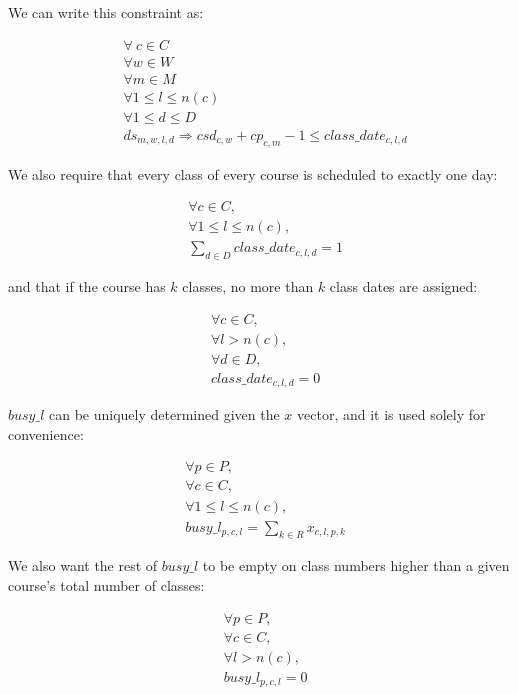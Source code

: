 We can write this constraint as:

\begin{align}
  &\forall\ c \in C\\
  &\forall w \in W\\
  &\forall m \in M\\
  &\forall 1 \le l \le n(c)\\
  &\forall 1 \le d \le D\\
  &ds_{m, w, l, d} \Rightarrow csd_{c, w} + cp_{c, m} - 1 \le class\_date_{c, l, d}
\end{align}

We also require that every class of every course is scheduled to exactly one day:

\begin{align} \label{eq:oneclassdate}
  &\forall c \in C,\\
  &\forall 1 \le l \le n(c),\\
  &\sum_{d \in D} class\_date_{c, l, d} = 1
\end{align}

and that if the course has $k$ classes, no more than $k$ class dates are assigned:

\begin{align} \label{eq:maxclassdates}
  &\forall c \in C,\\
  &\forall l > n(c),\\
  &\forall d \in D,\\
  &class\_date_{c, l, d} = 0
\end{align}

$busy\_l$ can be uniquely determined given the $x$ vector, and it is used solely for convenience:

\begin{align}
  &\forall p \in P,\\
  &\forall c \in C,\\
  &\forall 1\le l \le n(c),\\
  &busy\_l_{p, c, l} = \sum_{k \in R} x_{c, l, p, k}
\end{align}

We also want the rest of $busy\_l$ to be empty on class numbers higher than a given course's total number of classes:

\begin{align}
  &\forall p \in P,\\
  &\forall c \in C,\\
  &\forall l > n(c),\\
  &busy\_l_{p, c, l} = 0
\end{align}

